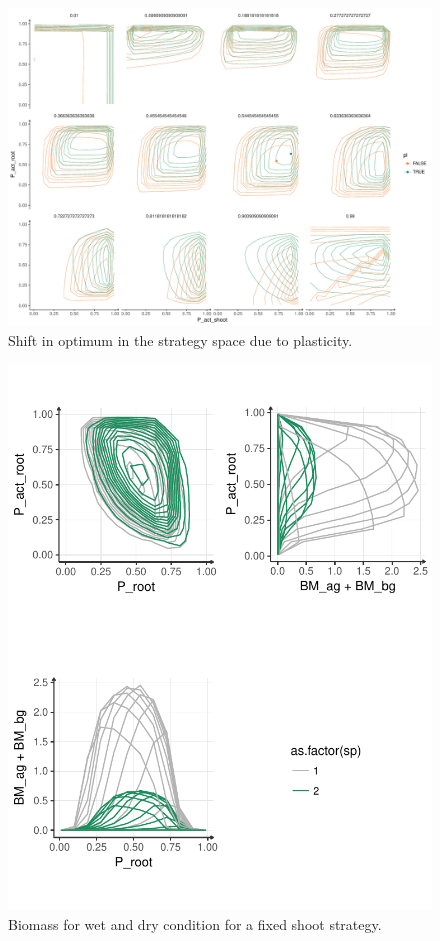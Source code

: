 \documentclass[review]{elsarticle}
\begin{document}
\begin{figure}
\includegraphics[width = \textwidth]{./Figures/optimum_shifting_pl_10034.pdf}
\caption{Shift in optimum in the strategy space due to plasticity.}
\end{figure}


\begin{figure}
\includegraphics[width = \textwidth]{./Figures/abs_BM_weather_10034.pdf}
\caption{Biomass for wet and dry condition for a fixed shoot strategy.}
\end{figure}
\end{document}
